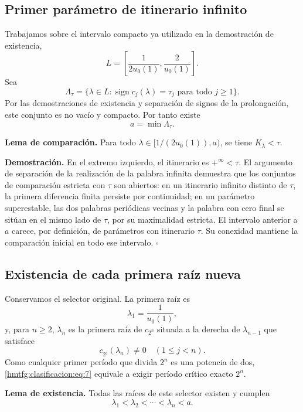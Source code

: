 \subsection{Primer parámetro de itinerario infinito}
\label{hmtfg:clasificacion:3}

Trabajamos sobre el intervalo compacto ya utilizado en la demostración de existencia,
\[
L=\left[\frac1{2u_0(1)},\frac2{u_0(1)}\right].
\]
Sea
\[
\Lambda_\tau=\{\lambda\in L:
\operatorname{sign}c_j(\lambda)=\tau_j\text{ para todo }j\ge1\}.
\]
Por las demostraciones de existencia y separación de signos de la prolongación, este conjunto es no vacío y compacto. Por tanto existe
\begin{equation}
a=\min\Lambda_\tau.
\label{hmtfg:clasificacion:eq:6}
\end{equation}

\textbf{Lema de comparación.} Para todo \(\lambda\in[1/(2u_0(1)),a)\), se tiene \(K_\lambda<\tau\).

\textbf{Demostración.} En el extremo izquierdo, el itinerario es \(+^\infty<\tau\). El argumento de separación de la realización de la palabra infinita demuestra que los conjuntos de comparación estricta con \(\tau\) son abiertos: en un itinerario infinito distinto de \(\tau\), la primera diferencia finita persiste por continuidad; en un parámetro superestable, las dos palabras periódicas vecinas y la palabra con cero final se sitúan en el mismo lado de \(\tau\), por su maximalidad estricta. El intervalo anterior a \(a\) carece, por definición, de parámetros con itinerario \(\tau\). Su conexidad mantiene la comparación inicial en todo ese intervalo. \(\square\)


\subsection{Existencia de cada primera raíz nueva}
\label{hmtfg:clasificacion:4}

Conservamos el selector original. La primera raíz es
\[
\lambda_1=\frac1{u_0(1)},
\]
y, para \(n\ge2\), \(\lambda_n\) es la primera raíz de \(c_{2^n}\) situada a la derecha de \(\lambda_{n-1}\) que satisface
\begin{equation}
c_{2^j}(\lambda_n)\ne0\quad(1\le j<n).
\label{hmtfg:clasificacion:eq:7}
\end{equation}
Como cualquier primer período que divida \(2^n\) es una potencia de dos, \eqref{hmtfg:clasificacion:eq:7} equivale a exigir período crítico exacto \(2^n\).

\textbf{Lema de existencia.} Todas las raíces de este selector existen y cumplen
\begin{equation}
\lambda_1<\lambda_2<\cdots<\lambda_n<a.
\label{hmtfg:clasificacion:eq:8}
\end{equation}

